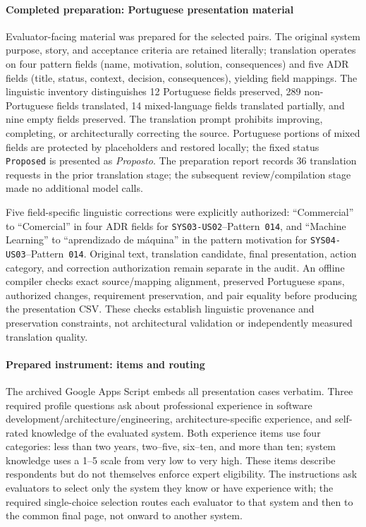 \paragraph{Completed preparation: Portuguese presentation material}
Evaluator-facing material was prepared for the
\ExpertPreparedCaseCount{} selected pairs. The original system purpose,
story, and acceptance criteria are retained literally; translation operates
on four pattern fields (name, motivation, solution, consequences) and five
ADR fields (title, status, context, decision, consequences), yielding
\ExpertMappingCount{} field mappings. The linguistic inventory distinguishes
12 Portuguese fields preserved, 289 non-Portuguese fields translated,
14 mixed-language fields translated partially, and nine empty fields
preserved. The translation prompt prohibits improving, completing, or
architecturally correcting the source. Portuguese portions of mixed fields
are protected by placeholders and restored locally; the fixed status
\texttt{Proposed} is presented as \emph{Proposto}. The preparation report
records 36 translation requests in the prior translation stage; the subsequent
review/compilation stage made no additional model calls.

Five field-specific linguistic corrections were explicitly authorized:
``Commercial'' to ``Comercial'' in four ADR fields for
\texttt{SYS03-US02}--Pattern~\texttt{014}, and ``Machine Learning'' to
``aprendizado de m\'aquina'' in the pattern motivation for
\texttt{SYS04-US03}--Pattern~\texttt{014}. Original text, translation candidate,
final presentation, action category, and correction authorization remain
separate in the audit. An offline compiler checks exact source/mapping
alignment, preserved Portuguese spans, authorized changes, requirement
preservation, and pair equality before producing the presentation CSV.
These checks establish linguistic provenance and preservation constraints,
not architectural validation or independently measured translation quality.

\paragraph{Prepared instrument: items and routing}
The archived Google Apps Script embeds all presentation cases verbatim.
Three required profile questions ask about professional experience in software
development/architecture/engineering, architecture-specific experience, and
self-rated knowledge of the evaluated system. Both experience items use
four categories: less than two years, two--five, six--ten, and more than ten;
system knowledge uses a 1--5 scale from very low to very high. These items
describe respondents but do not themselves enforce expert eligibility.
The instructions ask evaluators to select only the system they know or have
experience with; the required single-choice selection routes each evaluator
to that system and then to the common final page, not onward to another
system.

